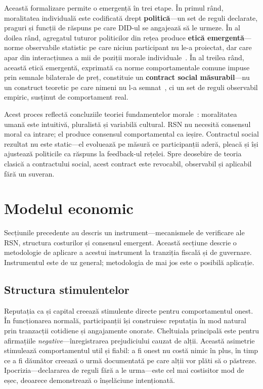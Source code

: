 \documentclass[11pt,a4paper,twocolumn]{article}
\begin{document}
Această formalizare permite o emergență în trei etape. În primul rând, moralitatea individuală este codificată drept \textbf{politică}---un set de reguli declarate, praguri și funcții de răspuns pe care DID-ul se angajează să le urmeze. În al doilea rând, agregatul tuturor politicilor din rețea produce \textbf{etică emergentă}---norme observabile statistic pe care niciun participant nu le-a proiectat, dar care apar din interacțiunea a mii de poziții morale individuale~\cite{durkheim1893}. În al treilea rând, această etică emergentă, exprimată ca norme comportamentale comune impuse prin semnale bilaterale de preț, constituie un \textbf{contract social măsurabil}---nu un construct teoretic pe care nimeni nu l-a semnat~\cite{rawls1971}, ci un set de reguli observabil empiric, susținut de comportament real.

Acest proces reflectă concluziile teoriei fundamentelor morale~\cite{haidt2012}: moralitatea umană este intuitivă, pluralistă și variabilă cultural. RSN nu necesită consensul moral ca intrare; el produce consensul comportamental ca ieșire. Contractul social rezultat nu este static---el evoluează pe măsură ce participanții aderă, pleacă și își ajustează politicile ca răspuns la feedback-ul rețelei. Spre deosebire de teoria clasică a contractului social, acest contract este revocabil, observabil și aplicabil fără un suveran.

\section{Modelul economic}

Secțiunile precedente au descris un instrument---mecanismele de verificare ale RSN, structura costurilor și consensul emergent. Această secțiune descrie o metodologie de aplicare a acestui instrument la tranziția fiscală și de guvernare. Instrumentul este de uz general; metodologia de mai jos este o posibilă aplicație.

\subsection{Structura stimulentelor}

Reputația ca și capital creează stimulente directe pentru comportamentul onest. În funcționarea normală, participanții își construiesc reputația în mod natural prin tranzacții cotidiene și angajamente onorate. Cheltuiala principală este pentru afirmațiile \emph{negative}---înregistrarea prejudiciului cauzat de alții. Această asimetrie stimulează comportamentul util și fiabil: a fi onest nu costă nimic în plus, în timp ce a fi dăunător creează o urmă documentată pe care alții vor plăti să o păstreze. Ipocrizia---declararea de reguli fără a le urma---este cel mai costisitor mod de eșec, deoarece demonstrează o înșelăciune intenționată.
\end{document}
